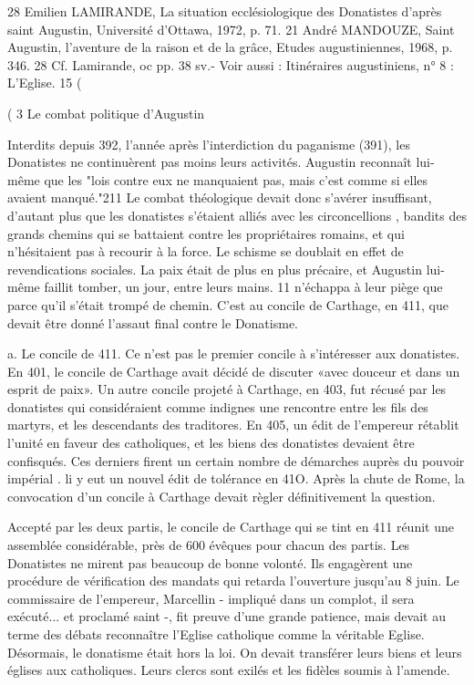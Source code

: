 28 Emilien LAMIRANDE, La situation ecclésiologique des Donatistes d'après saint Augustin, Université d'Ottawa, 1972, p. 71.
21 André MANDOUZE, Saint Augustin, l'aventure de la raison et de la grâce, Etudes augustiniennes, 1968, p. 346.
28 Cf. Lamirande, oc pp. 38 sv.- Voir aussi : Itinéraires augustiniens, n° 8 : L'Eglise.
15
(
 
 





(
3    Le  combat  politique  d'Augustin

Interdits depuis 392,	l'année après l'interdiction du	paganisme (391), les Donatistes ne continuèrent pas moins leurs activités. Augustin reconnaît lui-même que les "lois contre eux ne manquaient pas, mais c'est comme si elles avaient manqué."211  Le combat théologique devait donc s'avérer insuffisant, d'autant plus que les donatistes s'étaient alliés avec les circoncellions , bandits des grands chemins qui se battaient contre les propriétaires romains, et qui n'hésitaient pas à recourir à la force. Le schisme se doublait en effet de revendications sociales. La paix était de plus en plus précaire, et Augustin lui-même	faillit tomber, un jour, entre leurs mains. 11 n'échappa à leur piège que parce qu'il s'était trompé de chemin. C'est au concile de Carthage, en 411, que devait être donné l'assaut final contre le Donatisme.

a. Le concile de 411. Ce n'est pas le premier concile à s'intéresser aux donatistes. En 401, le concile de Carthage avait décidé de discuter «avec douceur et dans un esprit de paix». Un autre concile projeté à Carthage, en 403, fut récusé par les donatistes qui considéraient comme indignes une rencontre entre les fils des martyrs, et les descendants des traditores. En 405, un édit de l'empereur rétablit l'unité en faveur des catholiques, et les biens des donatistes devaient être confisqués. Ces derniers firent un certain nombre de démarches auprès du pouvoir impérial . li y eut un nouvel édit de tolérance en 41O. Après la chute de Rome, la convocation d'un concile à Carthage devait règler définitivement la question.

Accepté par les deux partis, le concile de Carthage qui se tint en 411 réunit une assemblée considérable, près de 600 évêques pour chacun des partis. Les Donatistes ne mirent pas beaucoup de bonne volonté. Ils engagèrent une procédure de vérification des mandats qui retarda l'ouverture jusqu'au 8 juin. Le commissaire de l'empereur, Marcellin - impliqué dans un complot, il sera exécuté... et proclamé saint -, fit preuve d'une grande patience, mais devait au terme des débats reconnaître l'Eglise catholique comme la véritable Eglise. Désormais, le donatisme était hors la loi. On devait transférer leurs biens et leurs églises aux catholiques. Leurs clercs sont exilés et les fidèles soumis à l'amende.

